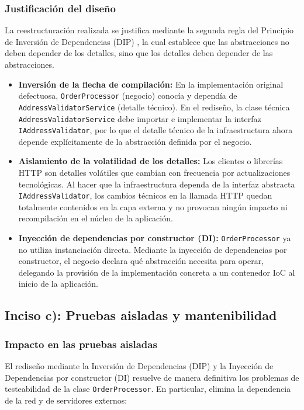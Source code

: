 \subsubsection*{Justificación del diseño}

La reestructuración realizada se justifica mediante la segunda regla del Principio de Inversión de Dependencias (DIP) \parencite{martin2017}, la cual establece que las abstracciones no deben depender de los detalles, sino que los detalles deben depender de las abstracciones.

\begin{itemize}
    \item \textbf{Inversión de la flecha de compilación:} En la implementación original defectuosa, \texttt{OrderProcessor} (negocio) conocía y dependía de \texttt{AddressValidatorService} (detalle técnico). En el rediseño, la clase técnica \texttt{AddressValidatorService} debe importar e implementar la interfaz \texttt{IAddressValidator}, por lo que el detalle técnico de la infraestructura ahora depende explícitamente de la abstracción definida por el negocio.
    \item \textbf{Aislamiento de la volatilidad de los detalles:} Los clientes o librerías HTTP son detalles volátiles que cambian con frecuencia por actualizaciones tecnológicas. Al hacer que la infraestructura dependa de la interfaz abstracta \texttt{IAddressValidator}, los cambios técnicos en la llamada HTTP quedan totalmente contenidos en la capa externa y no provocan ningún impacto ni recompilación en el núcleo de la aplicación.
    \item \textbf{Inyección de dependencias por constructor (DI):} \texttt{OrderProcessor} ya no utiliza instanciación directa. Mediante la inyección de dependencias por constructor, el negocio declara qué abstracción necesita para operar, delegando la provisión de la implementación concreta a un contenedor IoC al inicio de la aplicación.
\end{itemize}

\subsection{Inciso c): Pruebas aisladas y mantenibilidad}

\subsubsection*{Impacto en las pruebas aisladas}

El rediseño mediante la Inversión de Dependencias (DIP) y la Inyección de Dependencias por constructor (DI) resuelve de manera definitiva los problemas de testeabilidad de la clase \texttt{OrderProcessor}. En particular, elimina la dependencia de la red y de servidores externos:

